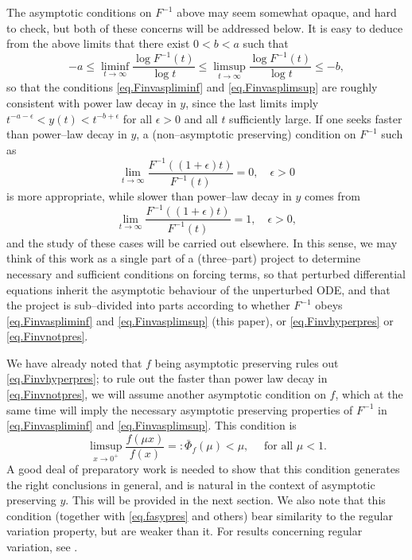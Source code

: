 \documentclass[a4paper,10pt,reqno]{amsart}
\numberwithin{equation}{section}
\theoremstyle{definition}
\theoremstyle{remark}
\DeclareMathOperator{\1}{\mathbbm 1}
\begin{document}
	The asymptotic conditions on $F^{-1}$ above may seem somewhat opaque, and hard to check, but both of these concerns will be addressed below. It is easy to deduce from the above limits that there exist $0<b<a$ such that 
	\[
	-a\leq \liminf_{t\to\infty} \frac{\log F^{-1}(t)}{\log t}\leq \limsup_{t\to\infty} \frac{\log F^{-1}(t)}{\log t}\leq -b,
	\]
	so that the conditions \eqref{eq.Finvaspliminf} and \eqref{eq.Finvasplimsup} are roughly consistent with power law decay in $y$, since the last limits imply $t^{-a-\epsilon}<y(t)<t^{-b+\epsilon}$ for all $\epsilon>0$ and all $t$ sufficiently large. If one seeks faster than power--law decay in $y$, a (non--asymptotic preserving) condition on $F^{-1}$ such as 
	\begin{equation}
		\label{eq.Finvnotpres}
		\lim_{t\to\infty} \frac{F^{-1}((1+\epsilon)t)}{F^{-1}(t)}=0, \quad \epsilon>0
	\end{equation}
	is more appropriate, while slower than power--law decay in $y$ comes from 
	\begin{equation}
		\label{eq.Finvhyperpres}
		\lim_{t\to\infty} \frac{F^{-1}((1+\epsilon)t)}{F^{-1}(t)}=1, \quad \epsilon>0,
	\end{equation}
	and the study of these cases will be carried out elsewhere. In this sense, we may think of this work as a single part of a (three--part) project to determine necessary and sufficient conditions on forcing terms, so that perturbed differential equations inherit the asymptotic behaviour of the unperturbed ODE, and that the project is sub--divided into parts according to whether $F^{-1}$ obeys \eqref{eq.Finvaspliminf} and \eqref{eq.Finvasplimsup} (this paper), or  \eqref{eq.Finvhyperpres} or \eqref{eq.Finvnotpres}.  
	
	We have already noted that $f$ being asymptotic preserving rules out \eqref{eq.Finvhyperpres}; to rule out the faster than power law decay in \eqref{eq.Finvnotpres}, we will assume another asymptotic condition on $f$, which at the same time will imply the necessary asymptotic preserving properties of $F^{-1}$ in \eqref{eq.Finvaspliminf} and \eqref{eq.Finvasplimsup}. This condition is 
	\begin{equation} \label{eq.fasypresmu}
		\limsup_{x\to 0^+} \frac{f(\mu x)}{f(x)}=:\bar{\Phi}_f(\mu)<\mu, \quad \text{ for all $\mu<1$}.
	\end{equation}
	A good deal of preparatory work is needed to show that this condition generates the right conclusions in general, and is natural in the context of asymptotic preserving $y$. This will be provided in the next section. We also note that this condition (together with \eqref{eq.fasypres} and others) bear similarity to the regular variation property, but are weaker than it. For results concerning regular variation, see \cite{BGT}.
	
\end{document}
